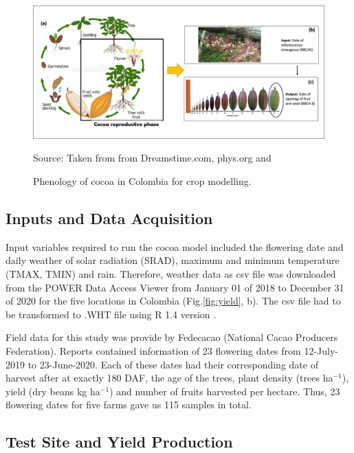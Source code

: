 \documentclass[gene,journal,article,submit,moreauthors,pdftex]{Definitions/mdpi}
\begin{document}
\begin{figure}[h!]
	\centering
	\includegraphics[scale=0.4]{images/phenology.png}\\
	\caption{\footnotesize {Phenology of cocoa in Colombia for crop modelling.\\}} 
	\footnotesize{Source: Taken from from Dreamstime.com, phys.org \citep{toledo2021} and \cite{lopez2018}}
	\label{fig:pheno}
\end{figure}


\subsection{Inputs and Data Acquisition }

{\color{olive} Input variables required to run the cocoa model included the flowering date and daily weather of solar radiation (SRAD), maximum and minimum temperature (TMAX, TMIN) and rain. Therefore, weather data as csv file was  downloaded from the POWER Data Access Viewer \citep{nasapower} from January 01 of 2018 to December 31 of 2020 for the five locations in Colombia (Fig.\ref{fig:yield}, b). The csv file had to be transformed to .WHT file using R 1.4 version \citep{Rstudio2020}. 
	
Field data for this study was provide by Fedecacao  (National Cacao Producers Federation). Reports contained information of 23 flowering dates from 12-July-2019 to 23-June-2020. Each of these dates had  their corresponding date of harvest after at exactly 180 DAF,  the age of the trees, plant density (trees ha$^{-1}$), yield  (dry beans kg ha$^{-1}$) and number of fruits harvested per hectare. Thus, 23 flowering dates for five farms gave us 115 samples in total.}


\subsection{Test Site and Yield Production }
\end{document}
